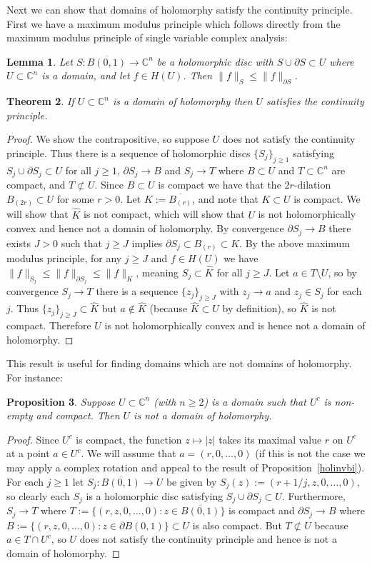 \documentclass[11pt,a4paper, final, twoside]{article}
\newtheorem{theorem}{Theorem}
\newtheorem{lemma}[theorem]{Lemma}
\newtheorem{proposition}[theorem]{Proposition}
\numberwithin{equation}{section}
\newcommand{\C}{\mathbb C}
\newcommand{\clos}[1]{\overline{#1}}
\newcommand{\bd}{\partial}
\newcommand{\ball}{B}
\newcommand{\hol}{H}
\newcommand{\dil}[2]{#1_{(#2)}}
\begin{document}
Next we can show that domains of holomorphy satisfy the continuity principle.
First we have a maximum modulus principle which follows directly from the maximum modulus principle of single variable complex analysis:
\begin{lemma}
Let $S\colon\clos{\ball(0,1)}\to\C^n$ be a holomorphic disc with $S\cup\bd S\subset U$ where $U\subset\C^n$ is a domain, and let $f\in\hol(U)$.
Then $\|f\|_S\leq \|f\|_{\bd S}$.
\end{lemma}
\begin{theorem}
\label{holcp}
If $U\subset\C^n$ is a domain of holomorphy then $U$ satisfies the continuity principle. 
\end{theorem}
\begin{proof}
We show the contrapositive, so suppose $U$ does not satisfy the continuity principle. Thus there is a sequence of holomorphic discs $\{S_j\}_{j\geq 1}$ satisfying $S_j\cup\bd S_j\subset U$
for all $j\geq 1$, $\bd S_j\to B$ and $S_j\to T$ where $B\subset U$ and $T\subset \C^n$ are compact, and $T\not\subset U$. Since $B\subset U$ is compact we have that
the $2r$-dilation $\dil{B}{2r}\subset U$ for some $r>0$. Let $K:=\clos{\dil{B}{r}}$, and note that $K\subset U$ is compact. We will show that 
$\hat K$ is not compact, which will show that $U$ is not holomorphically convex and hence not a domain of holomorphy. By convergence $\bd S_j\to B$ there exists
$J>0$ such that $j\geq J$ implies $\bd S_j\subset \dil{B}{r}\subset K$. By the above maximum modulus principle, for any
$j\geq J$ and $f\in\hol(U)$ we have $\|f\|_{S_j}\leq \|f\|_{\bd S_j}\leq \|f\|_K$,
meaning $S_j\subset\hat K$ for all $j\geq J$. Let $a\in T\setminus U$, so by convergence $S_j\to T$ there is a sequence $\{z_j\}_{j\geq J}$ with $z_j\to a$ and $z_j\in S_j$ for each $j$.
Thus $\{z_j\}_{j\geq J}\subset\hat K$ but $a\not\in\hat K$ (because $\hat K\subset U$ by definition), so $\hat K$ is not compact. Therefore $U$ is not holomorphically convex and is hence
not a domain of holomorphy.
\end{proof}
This result is useful for finding domains which are not domains of holomorphy. For instance: 
\begin{proposition}
Suppose $U\subset\C^n$ (with $n\geq 2$) is a domain such that $U^c$ is non-empty and compact. Then $U$ is not a domain of holomorphy.
\end{proposition}
\begin{proof}
Since $U^c$ is compact, the function $z\mapsto |z|$ takes its maximal value $r$ on $U^c$ at a point $a\in U^c$. We will assume that $a=(r,0,\dots,0)$ (if this is not the case we may apply a complex rotation
and appeal to the result of Proposition~\ref{holinvbi}).
For each $j\geq 1$ let $S_j\colon \clos{\ball(0,1)}\to U$ be given by $S_j(z):=(r+1/j,z,0,\dots,0)$, so clearly each $S_j$ is a holomorphic disc satisfying
$S_j\cup \bd S_j\subset U$. Furthermore, $S_j\to T$ where $T:=\{(r,z,0,\dots,0)\colon z\in\clos{\ball(0,1)}\}$ is compact
and $\bd S_j\to B$ where $B:=\{(r,z,0,\dots,0)\colon z\in\bd\ball(0,1)\}\subset U$ is also compact. But $T\not\subset U$ because $a\in T\cap U^c$,
so $U$ does not satisfy the continuity principle and hence is not a domain of holomorphy.
\end{proof}
\end{document}

